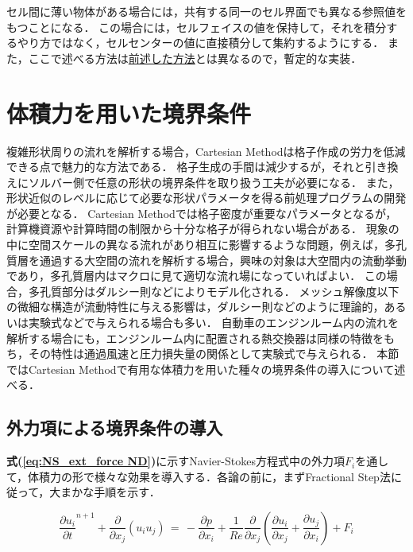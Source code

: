 セル間に薄い物体がある場合には，共有する同一のセル界面でも異なる参照値をもつことになる．
この場合には，セルフェイスの値を保持して，それを積分するやり方ではなく，セルセンターの値に直接積分して集約するようにする．
また，ここで述べる方法は\hyperlink{tgt:modify by cut}{前述した方法}とは異なるので，暫定的な実装．

\pagebreak

\section{体積力を用いた境界条件}
複雑形状周りの流れを解析する場合，Cartesian Methodは格子作成の労力を低減できる点で魅力的な方法である．
格子生成の手間は減少するが，それと引き換えにソルバー側で任意の形状の境界条件を取り扱う工夫が必要になる．
また，形状近似のレベルに応じて必要な形状パラメータを得る前処理プログラムの開発が必要となる．
Cartesian Methodでは格子密度が重要なパラメータとなるが，計算機資源や計算時間の制限から十分な格子が得られない場合がある．
現象の中に空間スケールの異なる流れがあり相互に影響するような問題，例えば，多孔質層を通過する大空間の流れを解析する場合，興味の対象は大空間内の流動挙動であり，多孔質層内はマクロに見て適切な流れ場になっていればよい．
この場合，多孔質部分はダルシー則などによりモデル化される．
メッシュ解像度以下の微細な構造が流動特性に与える影響は，ダルシー則などのように理論的，あるいは実験式などで与えられる場合も多い．
自動車のエンジンルーム内の流れを解析する場合にも，エンジンルーム内に配置される熱交換器は同様の特徴をもち，その特性は通過風速と圧力損失量の関係として実験式で与えられる．
本節ではCartesian Methodで有用な\hypertarget{tgt:body_force_bc}{体積力を用いた種々の境界条件}の導入について述べる．

%
\subsection{外力項による境界条件の導入}
\label{sec:external force method}

\textbf{式(\ref{eq:NS_ext_force ND})}に示すNavier-Stokes方程式中の外力項$F_{i}$を通して，体積力の形で様々な効果を導入する．各論の前に，まずFractional Step法に従って，大まかな手順を示す．

\begin{equation}
{\frac{\partial u_{i}}{\partial t}}^{n+1} + \frac{\partial}{\partial x_{j}} \left({ u_{i} u_{j} }\right)
\, =\,
- \frac{\partial p}{\partial x_{i}} + \frac{1}{Re} \frac{\partial}{\partial x_{j}} 
\left({ \frac{\partial u_{i}}{\partial x_{j}} + \frac{\partial u_{j}}{\partial x_{i}} }\right) + F_{i}
\label{eq:NS_ext_force ND}
\end{equation}


